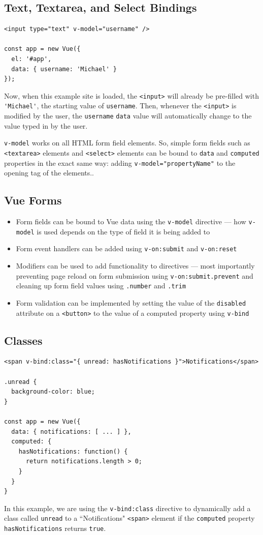 \documentclass[a4paper, 12pt]{article}
\begin{document}
\subsection{Text, Textarea, and Select Bindings}
\begin{verbatim}
<input type="text" v-model="username" />

const app = new Vue({ 
  el: '#app',
  data: { username: 'Michael' } 
});
\end{verbatim}
Now, when this example site is loaded, the \verb|<input>| will already be pre-filled with \verb|'Michael'|, the starting value of \verb|username|. Then, whenever the \verb|<input>| is modified by the user, the \verb|username| \verb|data| value will automatically change to the value typed in by the user.

\verb|v-model| works on all HTML form field elements. So, simple form fields such as \verb|<textarea>| elements and \verb|<select>| elements can be bound to \verb|data| and \verb|computed| properties in the exact same way: adding \verb|v-model="propertyName"| to the opening tag of the elements..

\subsection{Vue Forms}
\begin{itemize}
\item Form fields can be bound to Vue data using the \verb|v-model| directive — how \verb|v-model| is used depends on the type of field it is being added to

\item Form event handlers can be added using \verb|v-on:submit| and \verb|v-on:reset|

\item Modifiers can be used to add functionality to directives — most importantly preventing page reload on form submission using \verb|v-on:submit.prevent| and cleaning up form field values using \verb|.number| and \verb|.trim|

\item Form validation can be implemented by setting the value of the \verb|disabled| attribute on a \verb|<button>| to the value of a computed property using \verb|v-bind|
\end{itemize}

\subsection{Classes}
\begin{verbatim}
<span v-bind:class="{ unread: hasNotifications }">Notifications</span>

.unread {
  background-color: blue;
}

const app = new Vue({
  data: { notifications: [ ... ] },
  computed: {
    hasNotifications: function() {
      return notifications.length > 0;
    }
  }
}
\end{verbatim}
In this example, we are using the \verb|v-bind:class| directive to dynamically add a class called \verb|unread| to a ``Notifications" \verb|<span>| element if the \verb|computed| property \verb|hasNotifications| returns \verb|true|.
\end{document}
